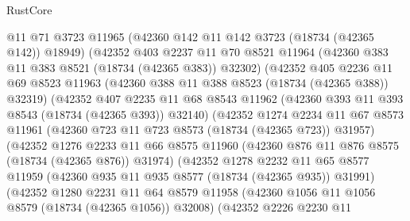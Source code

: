\begin{lexlean}{RustCore}
\begin{coremodule}
                    @11
                    @71
                    @3723
                    @11965
                    (@42360 @142 @11 @142 @3723 (@18734 (@42365 @142)) @18949)
                    (@42352
                      @403
                      @2237
                      @11
                      @70
                      @8521
                      @11964
                      (@42360 @383 @11 @383 @8521 (@18734 (@42365 @383)) @32302)
                      (@42352
                        @405
                        @2236
                        @11
                        @69
                        @8523
                        @11963
                        (@42360 @388 @11 @388 @8523 (@18734 (@42365 @388)) @32319)
                        (@42352
                          @407
                          @2235
                          @11
                          @68
                          @8543
                          @11962
                          (@42360 @393 @11 @393 @8543 (@18734 (@42365 @393)) @32140)
                          (@42352
                            @1274
                            @2234
                            @11
                            @67
                            @8573
                            @11961
                            (@42360 @723 @11 @723 @8573 (@18734 (@42365 @723)) @31957)
                            (@42352
                              @1276
                              @2233
                              @11
                              @66
                              @8575
                              @11960
                              (@42360 @876 @11 @876 @8575 (@18734 (@42365 @876)) @31974)
                              (@42352
                                @1278
                                @2232
                                @11
                                @65
                                @8577
                                @11959
                                (@42360 @935 @11 @935 @8577 (@18734 (@42365 @935)) @31991)
                                (@42352
                                  @1280
                                  @2231
                                  @11
                                  @64
                                  @8579
                                  @11958
                                  (@42360 @1056 @11 @1056 @8579 (@18734 (@42365 @1056)) @32008)
                                  (@42352
                                    @2226
                                    @2230
                                    @11

\end{coremodule}
\end{lexlean}
